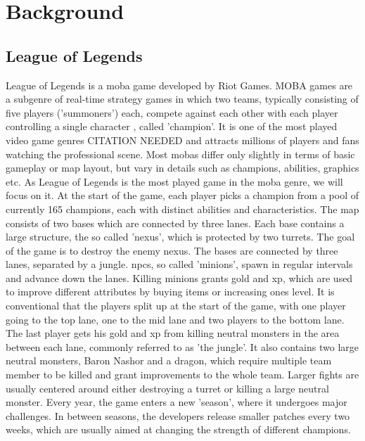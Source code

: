 \documentclass[12pt, a4paper, headinclude, twoside, plainheadsepline, open=right, numbers=noenddot, hidelinks, toc=listof, toc=bibliography]{scrreprt}
\begin{document}
\chapter{Background}
\label{chap:background}

\section{League of Legends}
\label{sec:LoL}

League of Legends is a \ac{moba} game developed by Riot Games.
MOBA games are a subgenre of real-time strategy games in which two teams, typically consisting of five players ('summoners') each, compete against each other with each player controlling a single character \cite{mora-cantallopsMOBAGamesLiterature2018}, called 'champion'.
It is one of the most played video game genres CITATION NEEDED and attracts millions of players and fans watching the professional scene.
Most \acp{moba} differ only slightly in terms of basic gameplay or map layout, but vary in details such as champions, abilities, graphics etc.
As League of Legends is the most played game in the \ac{moba} genre, we will focus on it.
At the start of the game, each player picks a champion from a pool of currently 165 champions, each with distinct abilities and characteristics.
The map consists of two bases which are connected by three lanes.
Each base contains a large structure, the so called 'nexus', which is protected by two turrets. 
The goal of the game is to destroy the enemy nexus.
The bases are connected by three lanes, separated by a jungle.
\Acp{npc}, so called 'minions', spawn in regular intervals and advance down the lanes.
Killing minions grants gold and \ac{xp}, which are used to improve different attributes by buying items or increasing ones level.
It is conventional that the players split up at the start of the game, with one player going to the top lane, one to the mid lane and two players to the bottom lane.
The last player gets his gold and \ac{xp} from killing neutral monsters in the area between each lane, commonly referred to as 'the jungle'.
It also contains two large neutral monsters, Baron Nashor and a dragon, which require multiple team member to be killed and grant improvements to the whole team.
Larger fights are usually centered around either destroying a turret or killing a large neutral monster.
Every year, the game enters a new 'season', where it undergoes major challenges. 
In between seasons, the developers release smaller patches every two weeks, which are usually aimed at changing the strength of different champions.
\end{document}
